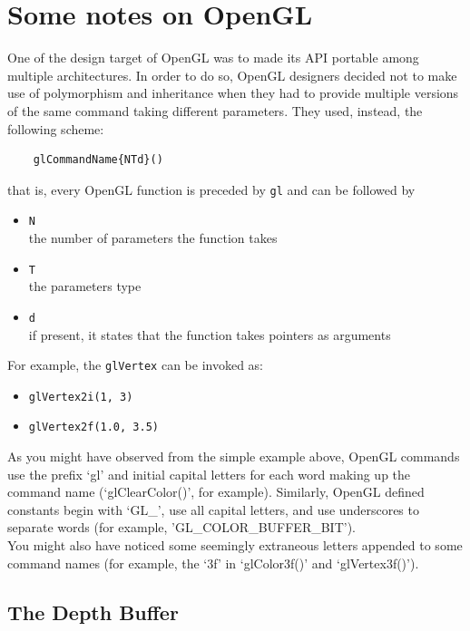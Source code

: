 \section{Some notes on OpenGL}
\label{opengl:opengl_notes}
\lstset{language=C++}

One of the design target of OpenGL was to made its API portable 
among multiple architectures. In order to do so, OpenGL 
designers decided not to make use of polymorphism and inheritance 
when they had to provide multiple versions of the same command 
taking different parameters. They used, instead, the following scheme:

\begin{verbatim}
    glCommandName{NTd}()
\end{verbatim}

that is, every OpenGL function is preceded by \texttt{gl} and can be 
followed by

\begin{itemize}
  \item \texttt{N} \\
    the number of parameters the function takes
  \item \texttt{T} \\
    the parameters type
  \item \texttt{d} \\
    if present, it states that the function takes pointers as arguments
\end{itemize}

For example, the \texttt{glVertex} can be invoked as:

\begin{itemize}
\item \texttt{glVertex2i(1, 3)}
\item \texttt{glVertex2f(1.0, 3.5)}
\end{itemize}

As you might have observed from the simple example above,
OpenGL commands use the prefix `gl' and initial capital letters
for each word making up the command name (`glClearColor()', for
example). Similarly, OpenGL defined constants begin with `GL\_', use all
capital letters, and use underscores to separate words (for example,
'GL\_COLOR\_BUFFER\_BIT').
\\
You might also have noticed some seemingly extraneous letters appended to
some command names (for example, the `3f' in `glColor3f()' and `glVertex3f()').

\subsection{The Depth Buffer}
\label{opengl:opengl_note:depth_buffer}

